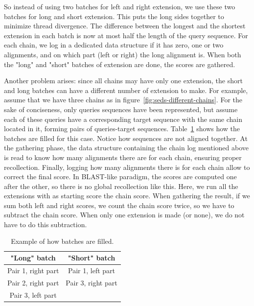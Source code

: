 So instead of using two batches for left and right extension, we use these two batches for long and short extension. This puts the long sides together to minimize thread divergence. The difference between the longest and the shortest extension in each batch is now at most half the length of the query sequence. For each chain, we log in a dedicated data structure if it has zero, one or two alignments, and on which part (left or right) the long alignment is. When both the "long" and "short" batches of extension are done, the scores are gathered.

Another problem arises: since all chains may have only one extension, the short and long batches can have a different number of extension to make. For example, assume that we have three chains as in figure~\ref{fig:seds-different-chains}. For the sake of conciseness, only queries sequences have been represented, but assume each of these queries have a corresponding target sequence with the same chain located in it, forming pairs of queries-target sequences. Table~\ref{tbl:batches} shows how the batches are filled for this case. Notice how sequences are not aligned together. At the gathering phase, the data structure containing the chain log mentioned above is read to know how many alignments there are for each chain, ensuring proper recollection. Finally, logging how many alignments there is for each chain allow to correct the final score. In BLAST-like paradigm, the scores are computed one after the other, so there is no global recollection like this. Here, we run all the extensions with as starting score the chain score. When gathering the result, if we sum both left and right scores, we count the chain score twice, so we have to subtract the chain score. When only one extension is made (or none), we do not have to do this subtraction.

\begin{table}
	\centering
	\begin{tabular}{|c|c|}
		\hline 
		\textbf{"Long" batch} & \textbf{"Short" batch} \\ 
		\hline 
		Pair 1, right part & Pair 1, left part \\ 
		\hline 
		Pair 2, right part & Pair 3, right part \\ 
		\hline 
		Pair 3, left part &  \\ 
		\hline 
	\end{tabular} 
	\caption{Example of how batches are filled.}
	\label{tbl:batches}
\end{table}

